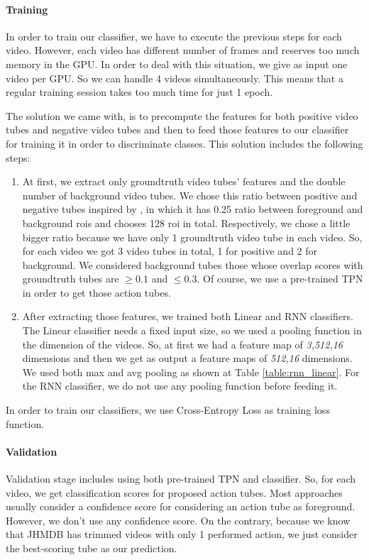 \paragraph{Training}
In order to train our classifier, we have to execute the previous steps for each video. However, each video
has different number of frames and reserves too much memory in the GPU. In order to deal with this situation,
we give as input one video per GPU. So we can handle 4 videos simultaneously. This means that a regular
training session takes too much time for just 1 epoch. \par
The solution we came with, is to precompute the features for both positive video tubes and negative video tubes and 
then to feed those features to our classifier for training  it in order to discriminate classes. This solution includes the following steps:
\begin{enumerate}
\item  At first, we extract only groundtruth video tubes' features and the double number of background video tubes. We chose this
ratio between positive and negative tubes inspired by \cite{jjfaster2rcnn}, in which it has 0.25 ratio between foreground
and background rois and chooses 128 roi in total. Respectively, we chose a little bigger ratio because we have only 1 groundtruth
video tube in each video. So, for each video we got 3 video tubes in total, 1 for positive and 2 for background. We considered
background tubes those whose overlap scores with groundtruth tubes are $ \ge 0.1 $ and $ \le 0.3 $. Of course, we use a pre-trained TPN
in order to get those action tubes.
\item After extracting those features, we trained both Linear and RNN classifiers. The Linear classifier needs a fixed input size, so
  we used a pooling function in the dimension of the videos. So, at first we had a feature map of \textit{3,512,16} dimensions and then
  we get as output a feature maps of \textit{512,16} dimensions. We used both max and avg pooling as shown at Table \ref{table:rnn_linear}.
  For the RNN classifier, we do not use any pooling function before feeding it.
\end{enumerate}
In order to train our classifiers, we use Cross-Entropy Loss as training loss function.
\paragraph{Validation} Validation stage includes using both pre-trained TPN and classifier. So, for each video,
we get classification scores for proposed action tubes. Most approaches usually consider a confidence score for
considering an action tube as foreground. However, we don't use any confidence score. On the contrary, because we
know that JHMDB has trimmed videos with only 1 performed action, we just consider the best-scoring tube as our prediction.


